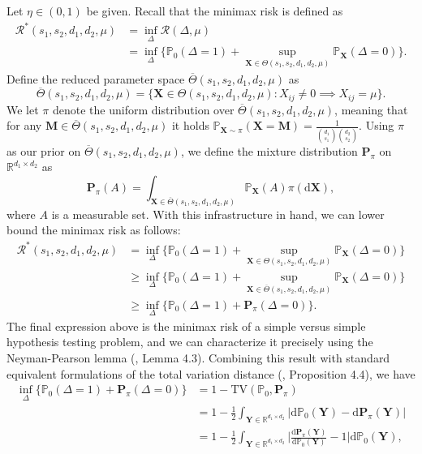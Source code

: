 \documentclass{article}
\newcommand{\D}{\textrm{d}}
\newcommand{\R}{\mathbb{R}}
\newcommand{\X}{\mathbf{X}}
\newcommand{\Y}{\mathbf{Y}}
\newcommand{\bbP}{\mathbb{P}}
\newcommand{\cR}{\mathcal{R}}
\theoremstyle{remark}
\begin{document}
\bigskip \noindent Let $\eta \in (0,1)$ be given. Recall that the minimax risk is defined as
\begin{align*}
    \cR^*(s_1,s_2,d_1,d_2, \mu) &= \inf_\Delta \cR(\Delta, \mu) \\ 
    &= \inf_\Delta\Big\{\mathbb P_{0}(\Delta = 1) + \sup_{\X \in \Theta(s_1,s_2,d_1,d_2, \mu)} \mathbb P_\X(\Delta = 0)\Big\}.
\end{align*}
Define the reduced parameter space $\overline{\Theta}(s_1, s_2, d_1, d_2, \mu)$ as
\[\overline{\Theta}(s_1, s_2, d_1, d_2, \mu) = \{\X \in \Theta(s_1, s_2, d_1, d_2, \mu) : X_{ij} \neq 0 \implies X_{ij} = \mu\}.\]
We let $\pi$ denote the uniform distribution over $\overline{\Theta}(s_1, s_2, d_1, d_2, \mu)$, meaning that for any $\mathbf M \in \overline{\Theta}(s_1, s_2, d_1, d_2, \mu)$ it holds $\bbP_{\X \sim \pi}(\X = \mathbf M) = \frac{1}{{d_1 \choose s_1}{d_2 \choose s_2}}$. Using $\pi$ as our prior on $\overline{\Theta}(s_1, s_2, d_1, d_2, \mu)$, we define the mixture distribution $\mathbf{P}_\pi$ on $\R^{d_1\times d_2}$ as
\[\mathbf P_{\pi}(A)=\int_{\X \in \overline{\Theta}(s_1, s_2, d_1, d_2, \mu)}\bbP_\X(A)\pi(\D \X),\]
where $A$ is a measurable set. With this infrastructure in hand, we can lower bound the minimax risk as follows:
\begin{align*}
    \cR^*(s_1,s_2,d_1,d_2, \mu) &=\inf_\Delta\Big\{\mathbb P_{0}(\Delta = 1) + \sup_{\X \in \Theta(s_1,s_2,d_1,d_2, \mu)} \mathbb P_\X(\Delta = 0)\Big\} \\
    &\geq \inf_\Delta\Big\{\mathbb P_{0}(\Delta = 1) + \sup_{\X \in \overline{\Theta}(s_1,s_2,d_1,d_2, \mu)} \mathbb P_\X(\Delta = 0)\Big\} \\
    &\geq \inf_\Delta\Big\{\mathbb P_{0}(\Delta = 1) + \mathbf P_\pi(\Delta = 0)\Big\}.
\end{align*}
The final expression above is the minimax risk of a simple versus simple hypothesis testing problem, and we can characterize it precisely using the Neyman-Pearson lemma (\cite{rigollet2023high}, Lemma 4.3). Combining this result with standard equivalent formulations of the total variation distance (\cite{rigollet2023high}, Proposition 4.4), we have
\begin{align*}
    \inf_\Delta\Big\{\mathbb P_{0}(\Delta = 1) + \mathbf P_\pi(\Delta = 0)\Big\} &= 1 - \text{TV}(\bbP_0, \mathbf P_{\pi}) \\
    &= 1 - \frac12\int_{\Y \in \R^{d_1\times d_2}}|\D\bbP_0(\Y) - \D \mathbf P_\pi (\Y)| \\
    &= 1 - \frac12\int_{\Y \in \R^{d_1\times d_2}}\Big|\frac{\D\mathbf P_\pi (\Y)}{\D \bbP_0(\Y)} - 1\Big|\D \bbP_0(\Y),
\end{align*}
\end{document}
